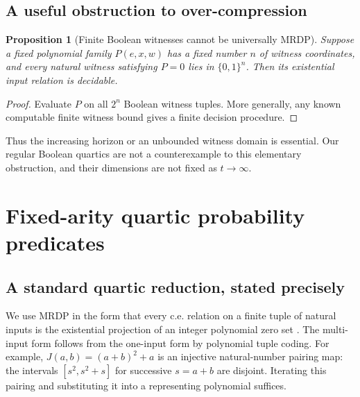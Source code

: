 \documentclass[11pt,letterpaper]{article}
\numberwithin{equation}{section}
\newtheorem{proposition}[theorem]{Proposition}
\theoremstyle{definition}
\theoremstyle{remark}
\newcommand{\Bit}{\{0,1\}}
\newcommand{\srcmark}[1]{\par\noindent{\small\itshape [source~#1]}\par}
\begin{document}
\subsection{A useful obstruction to over-compression}
\begin{proposition}[Finite Boolean witnesses cannot be universally MRDP]
Suppose a fixed polynomial family $P(e,x,w)$ has a fixed number $n$ of
witness coordinates, and every natural witness satisfying $P=0$ lies in
$\Bit^n$. Then its existential input relation is decidable.
\end{proposition}
\begin{proof}
Evaluate $P$ on all $2^n$ Boolean witness tuples. More generally, any known
computable finite witness bound gives a finite decision procedure.
\end{proof}
Thus the increasing horizon or an unbounded witness domain is essential.
Our regular Boolean quartics are not a counterexample to this elementary
obstruction, and their dimensions are not fixed as $t\to\infty$.

\section{Fixed-arity quartic probability predicates}\label{pqc:ql:sec:normalforms}
\srcmark{13}

\subsection{A standard quartic reduction, stated precisely}
We use MRDP in the form that every c.e. relation on a finite tuple of
natural inputs is the existential projection of an integer polynomial
zero set \cite{b62-matiyasevich1970,b62s13-repoMRDP}. The multi-input form follows from
the one-input form by polynomial tuple coding. For example,
$J(a,b)=(a+b)^2+a$ is an injective natural-number pairing map: the intervals
$[s^2,s^2+s]$ for successive $s=a+b$ are disjoint. Iterating this pairing
and substituting it into a representing polynomial suffices.
\end{document}
